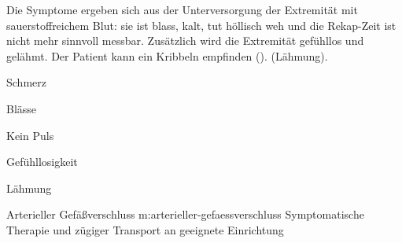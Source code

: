 {%
Die Symptome ergeben sich aus der Unterversorgung der
Extremität mit sauerstoffreichem Blut: sie ist blass,
kalt, tut höllisch weh und die Rekap-Zeit ist nicht
mehr sinnvoll messbar. Zusätzlich wird die Extremität
gefühllos und gelähmt. Der Patient kann ein Kribbeln
empfinden (). (Lähmung).

% 
}{%
\begin{compactitem}
  \item Schmerz
  \item Blässe
  \item Kein Puls
  \item Gefühllosigkeit
  \item Lähmung
\end{compactitem}
}{}{}{}


{Arterieller Gefäßverschluss}
{m:arterieller-gefaessverschluss}
{Symptomatische Therapie und zügiger Transport an
geeignete Einrichtung}
{}

% 

